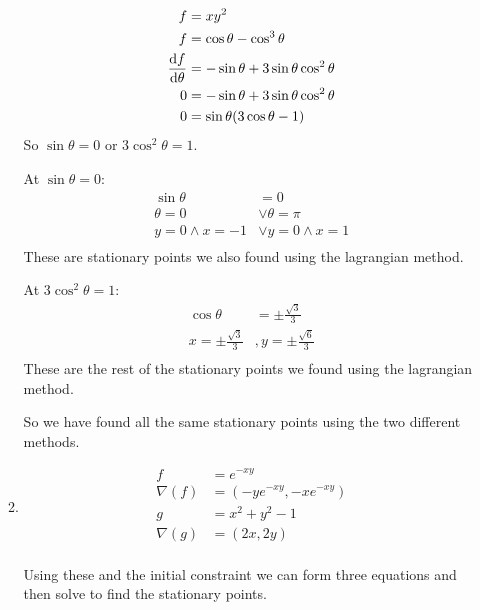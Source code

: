 \documentclass[10pt,\jkfside,a4paper]{article}
\begin{document}
\begin{enumerate}
\begin{enumerate}
\begin{equation}
\begin{split}
f &= xy^2 \\
f &= \cos \theta - \cos^3\theta \\
\dv{f}{\theta} &= -\sin\theta + 3\sin\theta\cos^2\theta \\
0 &= -\sin\theta + 3\sin\theta\cos^2\theta \\
0 &= \sin\theta(3\cos\theta - 1) \\
\end{split}
\end{equation}
So $\sin\theta = 0$ or $3\cos^2\theta = 1$.

At $\sin\theta = 0$:
\begin{equation}
\begin{split}
\sin\theta &= 0 \\
\theta = 0 &\vee \theta = \pi \\
y = 0 \wedge x = -1 &\vee y = 0 \wedge x = 1 \\
\end{split}
\end{equation}
These are stationary points we also found using the lagrangian method.

At $3\cos^2\theta = 1$:
\begin{equation}
\begin{split}
\cos\theta &= \pm\frac{\sqrt{3}}{3} \\
x = \pm\frac{\sqrt{3}}{3}&, y = \pm\frac{\sqrt{6}}{3} \\
\end{split}
\end{equation}
These are the rest of the stationary points we found using the lagrangian method.

So we have found all the same stationary points using the two different methods.

\item
\begin{equation}
\begin{split}
f &= e^{-xy} \\
\nabla(f) &= (-ye^{-xy}, -xe^{-xy}) \\
g &= x^{2} + y^{2} - 1 \\
\nabla(g) &= (2x, 2y) \\
\end{split}
\end{equation}

Using these and the initial constraint we can form three equations and then solve to 
find the stationary points.


\end{enumerate}
\end{enumerate}
\end{document}
